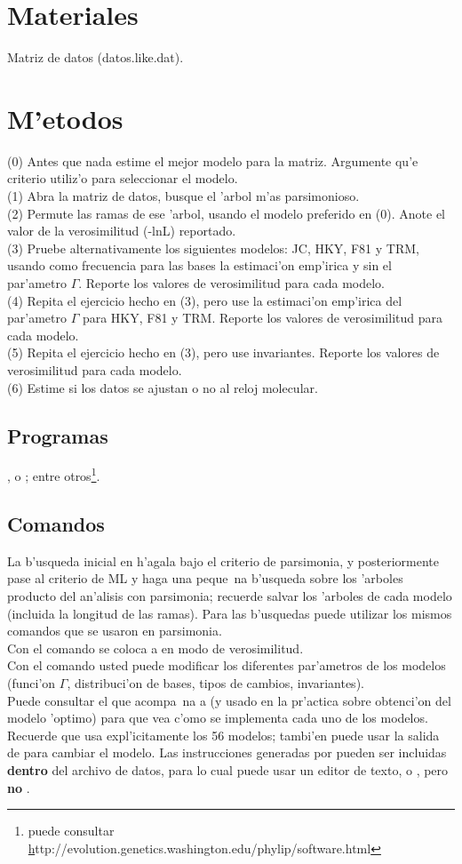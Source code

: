 \section{Materiales}
\noindent
Matriz de datos (datos.like.dat).
\section{M'etodos}
\noindent
(0) Antes que nada estime el mejor modelo para la matriz. Argumente qu'e criterio utiliz'o para seleccionar el modelo.\\
(1) Abra la matriz de datos, busque el 'arbol m'as parsimonioso.\\
(2) Permute las ramas de ese 'arbol, usando el modelo preferido en (0). Anote el valor de la verosimilitud (-lnL) reportado.\\
(3) Pruebe alternativamente los siguientes modelos: JC, HKY, F81 y TRM, usando como frecuencia para las bases la estimaci'on emp'irica y sin el par'ametro $\Gamma$. Reporte los valores de verosimilitud para cada modelo.\\
(4) Repita el ejercicio hecho en (3), pero use la estimaci'on emp'irica del par'ametro $\Gamma$ para HKY, F81 y TRM. Reporte los valores de verosimilitud para cada modelo.\\
(5) Repita el ejercicio hecho en (3), pero use invariantes. Reporte los valores de verosimilitud para cada modelo.\\
(6) Estime si los datos se ajustan o no al reloj molecular.
\subsection{Programas}
\noindent
{},  o ; entre otros\footnote{puede consultar 
\href{}http://evolution.genetics.washington.edu/phylip/software.html}.
\subsection{Comandos}
La b'usqueda inicial en  h'agala bajo el criterio de parsimonia, y posteriormente pase al criterio de ML y haga una \textrm{peque~na} b'usqueda sobre los 'arboles producto del an'alisis con parsimonia; recuerde salvar los 'arboles de cada modelo (incluida la longitud de las ramas). Para las b'usquedas puede utilizar los mismos comandos que se usaron en parsimonia.\\
Con el comando  se coloca a  en modo de verosimilitud.\\
Con el comando  usted puede modificar los diferentes par'ametros de los modelos (funci'on $\Gamma$, distribuci'on de bases, tipos de cambios, invariantes).\\ 
Puede consultar el  que acompa~na a  (y usado en la pr'actica sobre obtenci'on del modelo 'optimo) para que vea c'omo se implementa cada uno de los modelos. Recuerde que  usa expl'icitamente los 56 modelos; tambi'en puede usar la salida de  para cambiar el modelo. Las instrucciones generadas por  pueden ser incluidas \textbf{dentro} del archivo de datos, para lo cual puede usar un editor de texto,  o , pero \textbf{no} .
